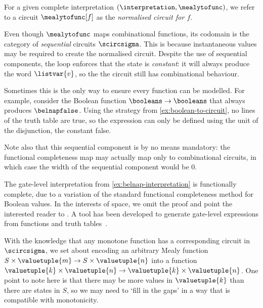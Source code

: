\documentclass{lmcs}
\begin{document}
For a given complete interpretation \((\interpretation,\mealytofunc)\), we refer
to a circuit \(\mealytofunc[f]\) as the \emph{normalised circuit for \(f\)}.\

\begin{rem}
    Even though \(\mealytofunc\) maps combinational functions, its codomain is
    the category of \emph{sequential} circuits \(\scircsigma\).
    This is because instantaneous values may be required to create the
    normalised circuit.
    Despite the use of sequential components, the loop enforces that the state
    is \emph{constant}: it will always produce the word \(\listvar{v}\), so the
    the circuit still has combinational behaviour.

    Sometimes this is the only way to ensure every function can be modelled.
    For example, consider the Boolean function \(\booleans \to \booleans\) that
    always produces \(\belnapfalse\).
    Using the strategy from \autoref{ex:boolean-to-circuit}, no lines of the truth
    table are true, so the expression can only be defined using the unit of the
    disjunction, the constant false.

    Note also that this sequential component is by no means mandatory: the
    functional completeness map may actually map only to combinational circuits,
    in which case the width of the sequential component would be \(0\).
\end{rem}

\begin{exa}
    The gate-level interpretation from \autoref{ex:belnap-interpretation} is
    functionally complete, due to a variation of the standard functional
    completeness method for Boolean values.
    In the interests of space, we omit the proof and point the interested reader
    to \cite[Sec.\ 4.5]{kaye2024foundations}.
    A tool has been developed to generate gate-level expressions from functions
    and truth tables~\cite{kaye2026belnap}.
\end{exa}

With the knowledge that any monotone function has a corresponding circuit
in \(\scircsigma\), we set about encoding an arbitrary Mealy function
\(S \times \valuetuple{m} \to S \times \valuetuple{n}\) into a function
\(\valuetuple{k} \times \valuetuple{n} \to \valuetuple{k} \times \valuetuple{n}\).
One point to note here is that there may be more values in \(\valuetuple{k}\)
than there are states in \(S\), so we may need to `fill in the gaps' in a way
that is compatible with monotonicity.
\end{document}
